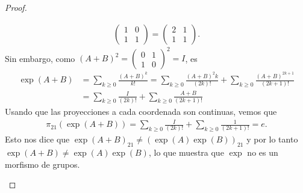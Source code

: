 \documentclass[11pt]{article}
\begin{document}
\begin{proof}
\begin{itemize}
\begin{align*}
\begin{pmatrix}
1 & 0\\
1 & 1
\end{pmatrix} = \begin{pmatrix}
2 & 1\\
1 & 1
\end{pmatrix}.
\end{align*}
Sin embargo, como $(A+B)^2 = \begin{pmatrix}
0 & 1\\
1 & 0
\end{pmatrix}^2 = I$, es
\begin{align*}
\exp(A+B) &= \sum_{k \geq 0}\frac{(A+B)^k}{k!} = \sum_{k \geq 0}\frac{(A+B)^2k}{(2k)!} + \sum_{k \geq 0}\frac{(A+B)^{2k+1}}{(2k+1)!}\\
&= \sum_{k \geq 0}\frac{I}{(2k)!} + \sum_{k \geq 0}\frac{A+B}{(2k+1)!}
\end{align*}
Usando que las proyecciones a cada coordenada son continuas, vemos que
\begin{align*}
\pi_{21}(\exp(A+B)) = \sum_{k \geq 0}\frac{I}{(2k)!} + \sum_{k \geq 0}\frac{1}{(2k+1)!} = e.
\end{align*}
Esto nos dice que $\exp(A+B)_{21} \neq (\exp(A)\exp(B))_{21}$ y por lo tanto $\exp(A+B) \neq \exp(A)\exp(B)$, lo que muestra que $\exp$ no es un morfismo de grupos.
\end{itemize}
\end{proof}
\end{document}

